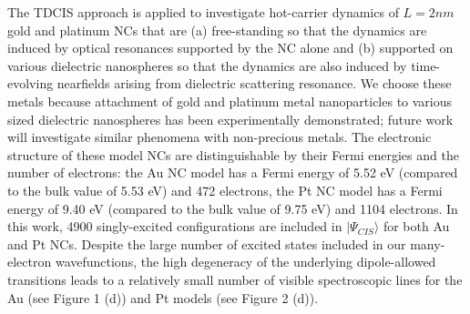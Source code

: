 \documentclass[journal=jpclcd,manuscript=letter]{achemso}
\begin{document}
The TDCIS approach is applied to investigate hot-carrier dynamics of $L=2nm$ gold and platinum NCs that are (a) free-standing so that
the dynamics are induced by optical resonances supported by the NC alone and (b) supported on various dielectric nanospheres so
that the dynamics are also induced by time-evolving nearfields arising from dielectric scattering resonance.  We choose these metals because 
attachment of gold and platinum metal nanoparticles to various sized dielectric nanospheres has been experimentally demonstrated; future
work will investigate similar phenomena with non-precious metals.
The electronic structure
of these model NCs are distinguishable by their Fermi energies and the number of electrons: the Au NC model has a Fermi energy
of 5.52 eV (compared to the bulk value of 5.53 eV) and 472 electrons, the Pt NC model has a Fermi energy of 9.40 eV (compared to the bulk
value of 9.75 eV) and 1104 electrons. 
In this work, 4900 singly-excited configurations are included in $|\Psi_{CIS}\rangle$ for both Au and Pt NCs.  
Despite the large number of excited states included in our many-electron wavefunctions, the high 
degeneracy of the underlying dipole-allowed transitions leads to a relatively small number of visible spectroscopic lines for the Au (see Figure 1 (d))
and Pt models (see Figure 2 (d)). 
\end{document}

